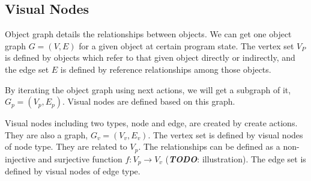 \subsection {Visual Nodes}
Object graph details the relationships between objects. We can get one object graph \(G = (V, E)\) for a given object at certain program state. The vertex set $V_P$ is defined by objects which refer to that given object directly or indirectly, and the edge set $E$ is defined by reference relationships among those objects.

By iterating the object graph using next actions, we will get a subgraph of it, \(G_p = (V_p, E_p)\). Visual nodes are defined based on this graph. 

Visual nodes including two types, node and edge, are created by create actions. They are also a graph, \(G_v = (V_v, E_v)\). The vertex set is defined by visual nodes of node type. They are related to $V_p$. The relationships can be defined as a non-injective and surjective function \(f:V_p\rightarrow V_v\) (\textbf{\textit{TODO}}: illustration). The edge set is defined by visual nodes of edge type.
